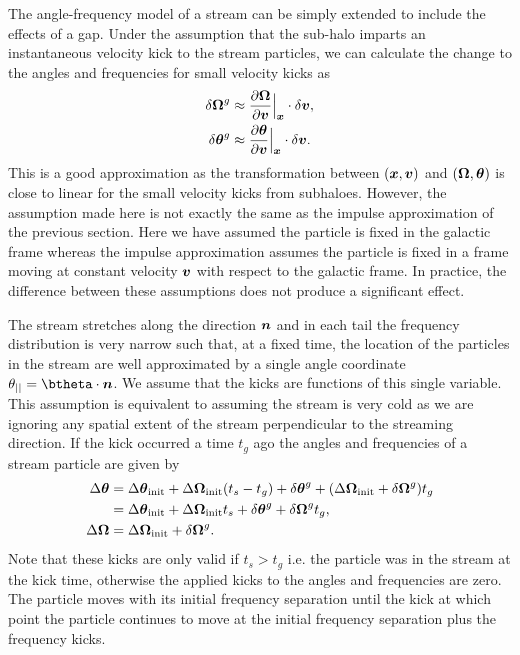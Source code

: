 \documentclass[useAMS,usenatbib,fleqn,a4paper]{mn2e}
\newcommand{\bs}[1]{\bmath{#1}}
\begin{document}
The angle-frequency model of a stream can be simply extended to include the effects of a gap. Under the assumption that the sub-halo imparts an instantaneous velocity kick to the stream particles, we can calculate the change to the angles and frequencies for small velocity kicks as
\begin{equation}\label{eq:kickfreqangle}
\begin{split}
\delta \boldsymbol{\Omega}^g &\approx \frac{\upartial \boldsymbol{\Omega}}{\upartial \bs{v}}\Big|_{\bs{x}}\cdot \delta\bs{v},\\
\delta \bs{\theta}^g &\approx \frac{\upartial \bs{\theta}}{\upartial \bs{v}}\Big|_{\bs{x}}\cdot \delta\bs{v}.
\end{split}
\end{equation}
This is a good approximation as the transformation between $(\bs{x},\bs{v})$ and $(\boldsymbol{\Omega},\bs{\theta})$ is close to linear for the small velocity kicks from subhaloes. However, the assumption made here is not exactly the same as the impulse approximation of the previous section. Here we have assumed the particle is fixed in the galactic frame whereas the impulse approximation assumes the particle is fixed in a frame moving at constant velocity $\bs{v}$ with respect to the galactic frame. In practice, the difference between these assumptions does not produce a significant effect.

The stream stretches along the direction $\bs{n}$ and in each tail the frequency distribution is very narrow such that, at a fixed time, the location of the particles in the stream are well approximated by a single angle coordinate $\theta_{||}=\btheta\cdot\bs{n}$. We assume that the kicks are functions of this single variable. This assumption is equivalent to assuming the stream is very cold as we are ignoring any spatial extent of the stream perpendicular to the streaming direction. If the kick occurred a time $t_g$ ago the angles and frequencies of a stream particle are given by
\begin{equation}\label{linearkickevol}
\begin{split}
\Delta\bs{\theta} &= \Delta\bs{\theta}_{\rm init}+\Delta\boldsymbol{\Omega}_{\rm init}(t_s-t_g)+\delta\bs{\theta}^g+(\Delta\boldsymbol{\Omega}_{\rm init}+\delta\boldsymbol{\Omega}^g)t_g \\&= \Delta\bs{\theta}_{\rm init}+\Delta\boldsymbol{\Omega}_{\rm init}t_s+\delta\bs{\theta}^g+\delta\boldsymbol{\Omega}^g t_g,\\
\Delta\boldsymbol{\Omega} &= \Delta\boldsymbol{\Omega}_{\rm init}+\delta\boldsymbol{\Omega}^g.
\end{split}
\end{equation}
Note that these kicks are only valid if $t_s>t_g$ i.e. the particle was in the stream at the kick time, otherwise the applied kicks to the angles and frequencies are zero.
The particle moves with its initial frequency separation until the kick at which point the particle continues to move at the initial frequency separation plus the frequency kicks.
\end{document}
